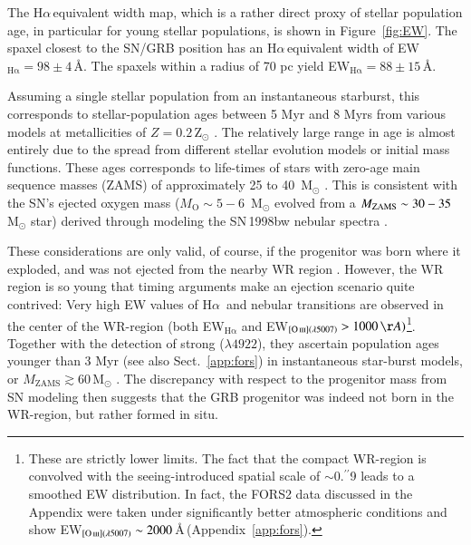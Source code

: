 \documentclass[traditabstract]{aa}
\newcommand{\farc}{\hbox{$.\!\!^{\prime\prime}$}}
\newcommand{\ha}{H$\alpha$}
\newcommand{\hei}{\ion{He}{i}}
\newcommand{\oiii}{[\ion{O}{iii}]}
\begin{document}
The \ha\,equivalent width map, which is a rather direct proxy of stellar population age, in particular for young stellar populations, is shown in Figure~\ref{fig:EW}. The spaxel closest to the SN/GRB position has an \ha\,equivalent width of EW$_{\mathrm{H\alpha}}=98\pm4$\,\AA. The spaxels within a radius of 70 pc yield EW$_{\mathrm{H\alpha}}=88\pm15$\,\AA. 

Assuming a single stellar population from an instantaneous starburst, this corresponds to stellar-population ages between 5 Myr and 8 Myrs from various models at metallicities of $Z=0.2$\,Z$_{\odot}$ \citep[see e.g.][and references therein]{2013ApJ...779..170L, 2016arXiv160703446K}. The relatively large range in age is almost entirely due to the spread from different stellar evolution models or initial mass functions. These ages corresponds to life-times of stars with zero-age main sequence masses (ZAMS) of approximately 25 to 40~M$_{\odot}$ \citep{1994A&AS..105...29F, 2005A&A...429..581M}. This is consistent with the SN's ejected oxygen mass ($M_{\mathrm{O}}\sim5-6$~M$_{\odot}$ evolved from a $M_{\rm{ZAMS}} \sim 30-35$\,M$_{\odot}$ star) derived through modeling the SN\,1998bw nebular spectra  \citep{2001ApJ...559.1047M, 2006ApJ...640..854M}.

These considerations are only valid, of course, if the progenitor was born where it exploded, and was not ejected from the nearby WR region \citep{2006A&A...454..103H}. However, the WR region is so young that timing arguments make an ejection scenario quite contrived: Very high EW values of \ha~and nebular transitions are observed in the center of the WR-region (both EW$_{\mathrm{H\alpha}}$ and EW$_{\oiii(\lambda5007)}>1000\,\AA)$\footnote{These are strictly lower limits. The fact that the compact WR-region is convolved with the seeing-introduced spatial scale of $\sim$0\farc{9} leads to a smoothed EW distribution. In fact, the FORS2 data discussed in the Appendix were taken under significantly better atmospheric conditions and show EW$_{\oiii(\lambda5007)}\sim2000$\,\AA\,(Appendix~\ref{app:fors}).}. Together with the detection of strong \hei($\lambda4922$), they ascertain population ages younger than 3 Myr (see also Sect.~\ref{app:fors}) in instantaneous star-burst models, or $M_{\mathrm{ZAMS}} \gtrsim 60$\,M$_{\odot}$ \citep[see e.g.][and references therein for a similar case]{2015MNRAS.451L..65T}. The discrepancy with respect to the progenitor mass from SN modeling then suggests that the GRB progenitor was indeed not born in the WR-region, but rather formed in situ. 
\end{document}
